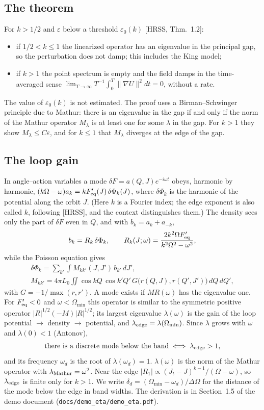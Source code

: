 \documentclass[11pt,a4paper]{article}
\begin{document}
\subsection{The theorem}

For $k>1/2$ and $\varepsilon$ below a threshold $\varepsilon_0(k)$ [HRSS, Thm.~1.2]:
\begin{itemize}
\item if $1/2<k\le1$ the linearized operator has an eigenvalue in the principal gap, so the
perturbation does not damp; this includes the King model;
\item if $k>1$ the point spectrum is empty and the field damps in the time-averaged sense
$\lim_{T\to\infty}T^{-1}\int_0^T\|\nabla U\|^2dt=0$, without a rate.
\end{itemize}
The value of $\varepsilon_0(k)$ is not estimated. The proof uses a Birman--Schwinger principle
due to Mathur: there is an eigenvalue in the gap if and only if the norm of the Mathur
operator $M_\lambda$ is at least one for some $\lambda$ in the gap. For $k>1$ they show
$M_\lambda\le C\varepsilon$, and for $k\le1$ that $M_\lambda$ diverges at the edge of the gap.

\subsection{The loop gain}
\label{sec:lazo}

In angle--action variables a mode $\delta F=a(Q,J)e^{-i\omega t}$ obeys, harmonic by
harmonic, $(k\Omega-\omega)a_k=kF_{\rm eq}'(J)\,\delta\Phi_k(J)$, where $\delta\Phi_k$ is the
harmonic of the potential along the orbit $J$. (Here $k$ is a Fourier index; the edge
exponent is also called $k$, following [HRSS], and the context distinguishes them.) The
density sees only the part of $\delta F$ even in $Q$, and with $b_k=a_k+a_{-k}$,
\[
  b_k=R_k\,\delta\Phi_k,\qquad R_k(J;\omega)=\frac{2k^2\Omega F_{\rm eq}'}{k^2\Omega^2-\omega^2},
\]
while the Poisson equation gives
\begin{gather*}
  \delta\Phi_k=\sum_{k'}\int M_{kk'}(J,J')\,b_{k'}\,dJ',\\
  M_{kk'}=4\pi L_0\iint\cos kQ\,\cos k'Q'\,G\big(r(Q,J),r(Q',J')\big)\,dQ\,dQ',
\end{gather*}
with $G=-1/\max(r,r')$.
A mode exists if $MR(\omega)$ has the eigenvalue one. For $F_{\rm eq}'<0$ and $\omega<\Omega_{\min}$
this operator is similar to the symmetric positive operator $|R|^{1/2}(-M)|R|^{1/2}$; its
largest eigenvalue $\lambda(\omega)$ is the gain of the loop potential $\to$ density $\to$
potential, and $\lambda_{\rm edge}=\lambda(\Omega_{\min})$. Since $\lambda$ grows with $\omega$ and
$\lambda(0)<1$ (Antonov),
\[
  \text{there is a discrete mode below the band}\iff\lambda_{\rm edge}>1,
\]
and its frequency $\omega_d$ is the root of $\lambda(\omega_d)=1$. $\lambda(\omega)$ is the norm of
the Mathur operator with $\lambda_{\rm Mathur}=\omega^2$. Near the edge
$|R_1|\propto(J_t-J)^{k-1}/(\Omega-\omega)$, so $\lambda_{\rm edge}$ is finite only for $k>1$. We
write $\delta_d=(\Omega_{\min}-\omega_d)/\Delta\Omega$ for the distance of the mode below the
edge in band widths. The derivation is in Section~1.5 of the demo document
(\texttt{docs/demo\_eta/demo\_eta.pdf}).
\end{document}

